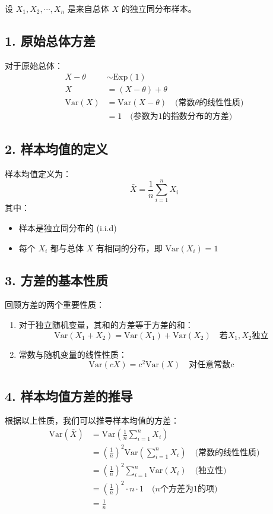\documentclass[UTF8]{report}
\theoremstyle{MyLineTheoremStyle} %
\theoremstyle{MyBlockTheoremStyle} %
\theoremstyle{MySubsubsectionStyle} %
\begin{document}
设 $X_1, X_2, \cdots, X_n$ 是来自总体 $X$ 的独立同分布样本。

\subsection*{1. 原始总体方差}
对于原始总体：
\begin{align*}
X-\theta &\sim \text{Exp}(1) \\
X &= (X-\theta) + \theta \\
\text{Var}(X) &= \text{Var}(X-\theta) \quad \text{(常数} \theta \text{的线性性质)} \\
&= 1 \quad \text{(参数为1的指数分布的方差)}
\end{align*}

\subsection*{2. 样本均值的定义}
样本均值定义为：
$$
\bar{X} = \frac{1}{n}\sum_{i=1}^n X_i
$$
其中：
\begin{itemize}
\item 样本是独立同分布的 (i.i.d)
\item 每个 $X_i$ 都与总体 $X$ 有相同的分布，即 $\text{Var}(X_i) = 1$
\end{itemize}

\subsection*{3. 方差的基本性质}
回顾方差的两个重要性质：
\begin{enumerate}
\item 对于独立随机变量，其和的方差等于方差的和：
$$
\text{Var}(X_1 + X_2) = \text{Var}(X_1) + \text{Var}(X_2) \quad \text{若} X_1, X_2 \text{独立}
$$
\item 常数与随机变量的线性性质：
$$
\text{Var}(cX) = c^2\text{Var}(X) \quad \text{对任意常数} c
$$
\end{enumerate}

\subsection*{4. 样本均值方差的推导}
根据以上性质，我们可以推导样本均值的方差：
\begin{align*}
\text{Var}(\bar{X}) &= \text{Var}(\frac{1}{n}\sum_{i=1}^n X_i) \\
&= (\frac{1}{n})^2\text{Var}(\sum_{i=1}^n X_i) \quad \text{(常数的线性性质)} \\
&= (\frac{1}{n})^2\sum_{i=1}^n \text{Var}(X_i) \quad \text{(独立性)} \\
&= (\frac{1}{n})^2 \cdot n \cdot 1 \quad \text{(}n\text{个方差为1的项)} \\
&= \frac{1}{n}
\end{align*}
\end{document}

